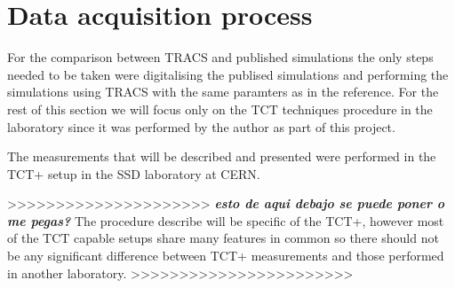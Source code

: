 
\section{Data acquisition process} %
\label{sec:future_improvements}

For the comparison between TRACS and published simulations the only steps needed to be taken were digitalising the publised simulations and performing the simulations using TRACS with the same paramters as in the reference. For the rest of this section we will focus only on the TCT techniques procedure in the laboratory since it was performed by the author as part of this project.


The measurements that will be described and presented were performed in the TCT+ setup in the SSD laboratory at CERN. 

>>>>>>>>>>>>>>>>>>>>>
\textbf{\emph{esto de aqui debajo se puede poner o me pegas?}}
The procedure describe will be specific of the TCT+, however most of the TCT capable setups share many features in common so there should not be any significant difference between TCT+ measurements and those performed in another laboratory.
>>>>>>>>>>>>>>>>>>>>>>>



